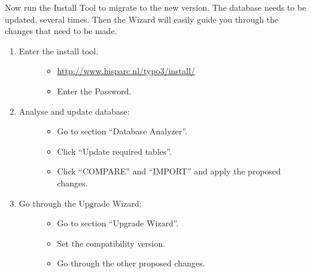 \documentclass[a4paper,11pt,english]{sphinxmanual}
\begin{document}
Now run the Install Tool to migrate to the new version.
The database needs to be updated, several times.
Then the Wizard will easily guide you through the changes that need to be made.
\begin{enumerate}
\item {} \begin{description}
\item[{Enter the install tool.}] \leavevmode\begin{itemize}
\item {} 
\href{http://www.hisparc.nl/typo3/install/}{http://www.hisparc.nl/typo3/install/}

\item {} 
Enter the Password.

\end{itemize}

\end{description}

\item {} \begin{description}
\item[{Analyse and update database:}] \leavevmode\begin{itemize}
\item {} 
Go to section ``Database Analyzer''.

\item {} 
Click ``Update required tables''.

\item {} 
Click ``COMPARE'' and ``IMPORT'' and apply the proposed changes.

\end{itemize}

\end{description}

\item {} \begin{description}
\item[{Go through the Upgrade Wizard:}] \leavevmode\begin{itemize}
\item {} 
Go to section ``Upgrade Wizard''.

\item {} 
Set the compatibility version.

\item {} 
Go through the other proposed changes.

\end{itemize}

\end{description}


\end{enumerate}
\end{document}
